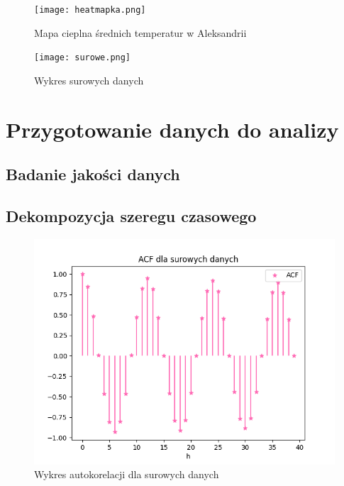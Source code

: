 \documentclass[12pt]{article}
\begin{document}
\begin{figure}[!htbp]
\hspace*{0 cm}
	\centering
	\texttt{[image: heatmapka.png]}
	\caption{Mapa cieplna średnich temperatur w Aleksandrii}
\end{figure}

\begin{figure}[!htbp]
\hspace*{0 cm}
	\centering
	\texttt{[image: surowe.png]}
	\caption{Wykres surowych danych}
\end{figure}

\section{Przygotowanie danych do analizy}
\subsection{Badanie jakości danych}
\subsection{Dekompozycja szeregu czasowego}

\begin{figure}[!htbp]
    \centering
    \includegraphics[scale=0.70]{surowe_acf.png}
    \caption{Wykres autokorelacji dla surowych danych}
    \label{fig:enter-label}
\end{figure}
\end{document}
